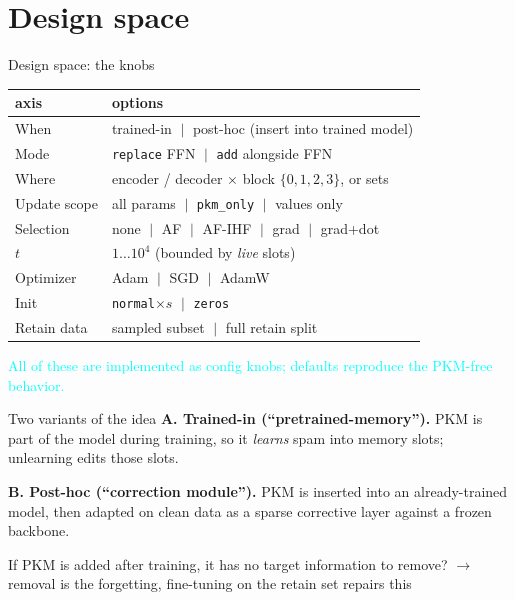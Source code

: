 \documentclass{beamer}
\newcommand{\pierre}[1]{\textcolor{cyan}{#1}}
\begin{document}
\section{Design space}

\begin{frame}{Design space: the knobs}
\begin{center}
\begin{tabular}{|l|l|}
\hline
\textbf{axis} & \textbf{options} \\
\hline
When       & trained-in $\;|\;$ post-hoc (insert into trained model) \\
Mode       & \texttt{replace} FFN $\;|\;$ \texttt{add} alongside FFN \\
Where      & encoder / decoder $\times$ block $\{0,1,2,3\}$, or sets \\
Update scope & all params $\;|\;$ \texttt{pkm\_only} $\;|\;$ values only \\
Selection  & none $\;|\;$ AF $\;|\;$ AF-IHF $\;|\;$ grad $\;|\;$ grad+dot \\
$t$        & $1 \ldots 10^4$ (bounded by \emph{live} slots) \\
Optimizer  & Adam $\;|\;$ SGD $\;|\;$ AdamW \\
Init       & \texttt{normal}$\times s$ $\;|\;$ \texttt{zeros} \\
Retain data & sampled subset $\;|\;$ full retain split \\
\hline
\end{tabular}
\end{center}

\medskip
\pierre{All of these are implemented as config knobs; defaults reproduce the
PKM-free behavior.}
\end{frame}

\begin{frame}{Two variants of the idea}
\textbf{A. Trained-in (``pretrained-memory'').}
PKM is part of the model during training, so it \emph{learns} spam into memory
slots; unlearning edits those slots.

\medskip
\textbf{B. Post-hoc (``correction module'').}
PKM is inserted into an already-trained model, then adapted on clean data as a
sparse corrective layer against a frozen backbone.

\medskip
If PKM is added after training, it has no target information to remove? $\to$ removal is the forgetting, fine-tuning on the retain set repairs this

\end{frame}
\end{document}
